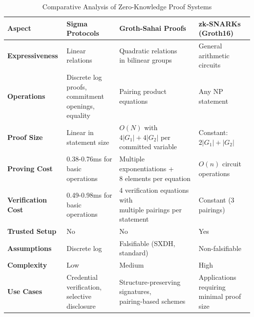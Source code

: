 \begin{table}[htbp]
\centering
\caption{Comparative Analysis of Zero-Knowledge Proof Systems}
\label{tab:zkp-comparison}
\begin{tabular}{|l|l|l|l|}
\hline
\textbf{Aspect} & \textbf{Sigma Protocols} & \textbf{Groth-Sahai Proofs} & \textbf{zk-SNARKs (Groth16)} \\
\hline
\textbf{Expressiveness} & Linear relations & \makecell{Quadratic relations \\in bilinear groups} & General arithmetic circuits \\
\hline
\textbf{Operations} & \makecell{Discrete log proofs,\\ commitment openings,\\ equality} & Pairing product equations & Any NP statement \\
\hline
\textbf{Proof Size} & Linear in statement size & \makecell{$O(N)$ with $4|G_1| + 4|G_2|$\\ per committed variable} & Constant: $2|G_1| + |G_2|$ \\
\hline
\textbf{Proving Cost} & \makecell{0.38-0.76ms for\\ basic operations} & \makecell{Multiple exponentiations +\\ 8 elements per equation} & $O(n)$ circuit operations \\
\hline
\textbf{Verification Cost} & \makecell{0.49-0.98ms for\\ basic operations} & \makecell{4 verification equations with\\ multiple pairings per statement} & Constant (3 pairings) \\
\hline
\textbf{Trusted Setup} & No & No & Yes \\
\hline
\textbf{Assumptions} & Discrete log & Falsifiable (SXDH, standard) & Non-falsifiable \\
\hline
\textbf{Complexity} & Low & Medium & High \\
\hline
\textbf{Use Cases} & \makecell{Credential verification,\\ selective disclosure} & \makecell{Structure-preserving signatures,\\ pairing-based schemes} & \makecell{Applications requiring\\ minimal proof size} \\
\hline
\end{tabular}
\end{table}

